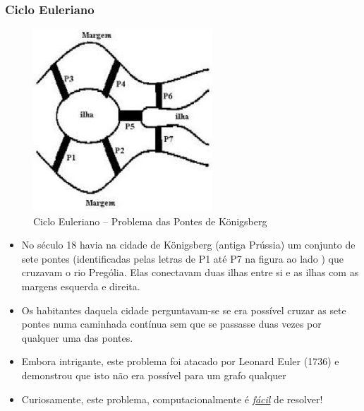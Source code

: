 \begin{frame}[fragile, allowframebreaks=0.9]
  \frametitle{Ciclo Euleriano}

\begin{figure}[!htb]
\centering
\includegraphics[width=0.60\textwidth, height=0.650\textheight]{figures/ilhas_euler.jpeg}
\caption{Ciclo Euleriano -- Problema das Pontes de Königsberg}
\end{figure}


\framebreak

\begin{itemize}
  \item No século 18 havia na cidade de Königsberg (antiga Prússia)  um conjunto de sete pontes
 (identificadas pelas letras de P1 até P7 na figura ao lado ) que cruzavam o rio  Prególia. 
 Elas conectavam duas ilhas  entre si e as ilhas com as margens esquerda
 e direita.
 
\item Os habitantes daquela cidade perguntavam-se se era possível cruzar 
as sete pontes numa caminhada contínua sem que se passasse duas vezes por 
qualquer uma das pontes.

\item  Embora intrigante, este problema foi atacado por Leonard Euler (1736) e demonstrou
que isto não era possível para um grafo qualquer

\item Curiosamente, este problema, computacionalmente é \underline{\textit{fácil}} de resolver!
\end{itemize}

\end{frame}



